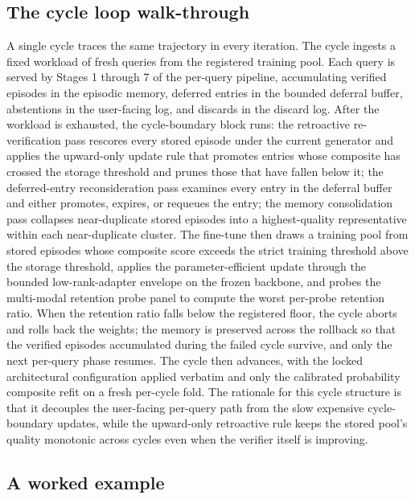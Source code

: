 \subsection{The cycle loop walk-through}
\label{sec:overview-cycle}

A single cycle traces the same trajectory in every iteration. The cycle ingests a fixed workload of fresh queries from the registered training pool. Each query is served by Stages 1 through 7 of the per-query pipeline, accumulating verified episodes in the episodic memory, deferred entries in the bounded deferral buffer, abstentions in the user-facing log, and discards in the discard log. After the workload is exhausted, the cycle-boundary block runs: the retroactive re-verification pass rescores every stored episode under the current generator and applies the upward-only update rule that promotes entries whose composite has crossed the storage threshold and prunes those that have fallen below it; the deferred-entry reconsideration pass examines every entry in the deferral buffer and either promotes, expires, or requeues the entry; the memory consolidation pass collapses near-duplicate stored episodes into a highest-quality representative within each near-duplicate cluster. The fine-tune then draws a training pool from stored episodes whose composite score exceeds the strict training threshold above the storage threshold, applies the parameter-efficient update through the bounded low-rank-adapter envelope on the frozen backbone, and probes the multi-modal retention probe panel to compute the worst per-probe retention ratio. When the retention ratio falls below the registered floor, the cycle aborts and rolls back the weights; the memory is preserved across the rollback so that the verified episodes accumulated during the failed cycle survive, and only the next per-query phase resumes. The cycle then advances, with the locked architectural configuration applied verbatim and only the calibrated probability composite refit on a fresh per-cycle fold. The rationale for this cycle structure is that it decouples the user-facing per-query path from the slow expensive cycle-boundary updates, while the upward-only retroactive rule keeps the stored pool's quality monotonic across cycles even when the verifier itself is improving.

\subsection{A worked example}
\label{sec:overview-worked-example}

